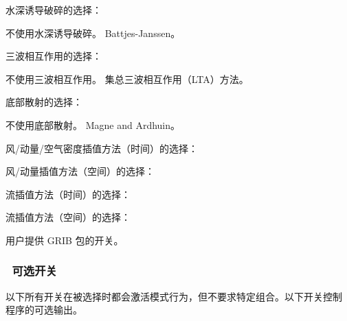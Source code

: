 \noindent
水深诱导破碎的选择：
\begin{slist}
 {不使用水深诱导破碎。}
 {Battjes-Janssen。}
\end{slist}

\noindent
三波相互作用的选择：
\begin{slist}
 {不使用三波相互作用。}
 {集总三波相互作用（LTA）方法。}
\end{slist}

\noindent
底部散射的选择：
\begin{slist}
 {不使用底部散射。}
 {Magne and Ardhuin。}
\end{slist}

\noindent
风/动量/空气密度插值方法（时间）的选择：
\begin{slist}
\end{slist}

\noindent
风/动量插值方法（空间）的选择：
\begin{slist}
\end{slist}

\noindent
流插值方法（时间）的选择：
\begin{slist}
\end{slist}

\noindent
流插值方法（空间）的选择：
\begin{slist}
\end{slist}

\noindent
用户提供 GRIB 包的开关。
\begin{slist}
\end{slist}

\vsssub
\subsubsection{~可选开关} \label{sub:opt_switch}
\vsssub

以下所有开关在被选择时都会激活模式行为，但不要求特定组合。以下开关控制 \ws{} 程序的可选输出。

